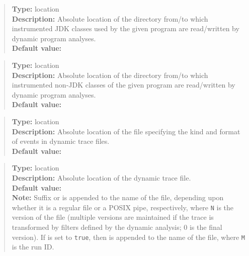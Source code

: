 \noindent {}
\begin{quote}
{\bf Type:} location \\
{\bf Description:} Absolute location of the directory from/to which instrumented JDK classes used by the given program are read/written by dynamic program analyses. \\
{\bf Default value:} 
\end{quote}

\noindent {}
\begin{quote}
{\bf Type:} location  \\
{\bf Description:} Absolute location of the directory from/to which instrumented non-JDK classes of the given program are read/written by dynamic program analyses. \\
{\bf Default value:} 
\end{quote}

\noindent {}
\begin{quote}
{\bf Type:} location \\
{\bf Description:} Absolute location of the file specifying the kind and format of events in dynamic trace files. \\
{\bf Default value:} 
\end{quote}

\noindent {}
\begin{quote}
{\bf Type:} location  \\
{\bf Description:} Absolute location of the dynamic trace file.  \\
{\bf Default value:}  \\
{\bf Note:} Suffix  or  is appended to the name of the file, depending upon whether it is a regular file or a POSIX pipe, respectively, where {\tt N} is the version of the file (multiple versions are maintained if the trace is transformed by filters defined by the dynamic analysis; 0 is the final version).  If  is set to {\tt true}, then  is appended to the name of the file, where {\tt M} is the run ID. 
\end{quote}



